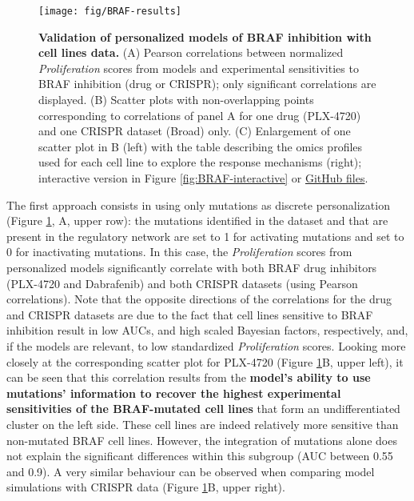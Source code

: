 \documentclass[a4paper,12pt,twoside,onecolumn,openright,final,oldfontcommands]{memoir}
\begin{document}
\begin{figure}

{\centering \texttt{[image: fig/BRAF-results]} 

}

\caption[Validation of personalized models of BRAF inhibition with cell lines data]{\textbf{Validation of personalized models of
BRAF inhibition with cell lines data.} (A) Pearson correlations between
normalized \emph{Proliferation} scores from models and experimental
sensitivities to BRAF inhibition (drug or CRISPR); only significant
correlations are displayed. (B) Scatter plots with non-overlapping
points corresponding to correlations of panel A for one drug (PLX-4720)
and one CRISPR dataset (Broad) only. (C) Enlargement of one scatter plot
in B (left) with the table describing the omics profiles used for each
cell line to explore the response mechanisms (right); interactive
version in Figure \ref{fig:BRAF-interactive} or
\href{https://github.com/sysbio-curie/PROFILE_BRAF_Model/blob/master/Analysis.html}{GitHub
files}.}\label{fig:BRAF-results}
\end{figure}














The first approach consists in using only mutations as discrete
personalization (Figure \ref{fig:BRAF-results}, A, upper row): the
mutations identified in the dataset and that are present in the
regulatory network are set to 1 for activating mutations and set to 0
for inactivating mutations. In this case, the \emph{Proliferation}
scores from personalized models significantly correlate with both BRAF
drug inhibitors (PLX-4720 and Dabrafenib) and both CRISPR datasets
(using Pearson correlations). Note that the opposite directions of the
correlations for the drug and CRISPR datasets are due to the fact that
cell lines sensitive to BRAF inhibition result in low AUCs, and high
scaled Bayesian factors, respectively, and, if the models are relevant,
to low standardized \emph{Proliferation} scores. Looking more closely at
the corresponding scatter plot for PLX-4720 (Figure
\ref{fig:BRAF-results}B, upper left), it can be seen that this
correlation results from the \textbf{model's ability to use mutations'
information to recover the highest experimental sensitivities of the
BRAF-mutated cell lines} that form an undifferentiated cluster on the
left side. These cell lines are indeed relatively more sensitive than
non-mutated BRAF cell lines. However, the integration of mutations alone
does not explain the significant differences within this subgroup (AUC
between 0.55 and 0.9). A very similar behaviour can be observed when
comparing model simulations with CRISPR data (Figure
\ref{fig:BRAF-results}B, upper right).
\end{document}
